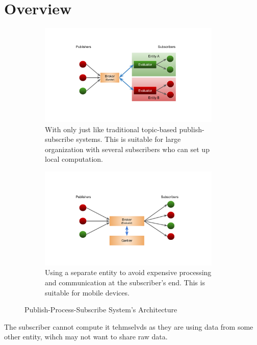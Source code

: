\section{Overview}
\label{sec:overview}

\begin{figure}[h]
	\centering
	\begin{subfigure}{0.45\textwidth}
		\centering
		\includegraphics[width=0.95\textwidth]{figures/pps-local}
		\caption{With only \broker just like traditional topic-based publish-subscribe systems. This is suitable for large organization with several subscribers who can set up local computation.}
		\label{fig:pps-local}
	\end{subfigure}
	\begin{subfigure}{0.45\textwidth}
		\centering
		\includegraphics[width=0.95\textwidth]{figures/pps-out}
		\caption{Using a separate entity to avoid expensive processing and communication at the subscriber's end. This is suitable for mobile devices.}
		\label{fig:pps-out}
	\end{subfigure}
	\caption{Publish-Process-Subscribe System's Architecture}
	\label{fig:pps}
\end{figure}


The subscriber cannot compute it tehmselvds as they are using data from some
other entity, wihch may not want to share raw data.
